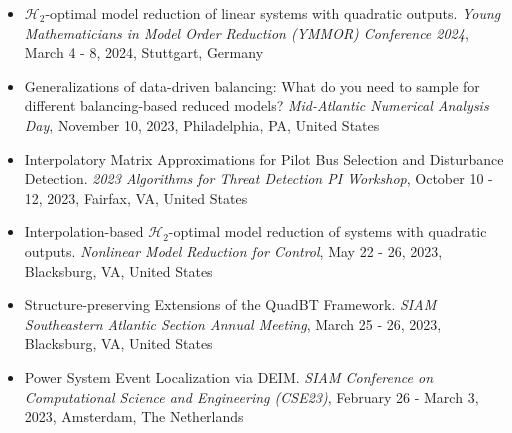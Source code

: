 \documentclass[10pt,a4paper,sans]{moderncv}        %
\begin{document}
\begin{itemize}
    \item $\mathcal{H}_2$-optimal model reduction of linear systems with quadratic outputs. \textit{Young Mathematicians in Model Order Reduction (YMMOR) Conference 2024}, March 4 - 8, 2024, Stuttgart, Germany
    \vspace{2pt}
    \item Generalizations of data-driven balancing: What do you need to sample for different balancing-based reduced models? \textit{Mid-Atlantic Numerical Analysis Day}, November 10, 2023, Philadelphia, PA, United States
    \vspace{2pt}
    \item Interpolatory Matrix Approximations for Pilot Bus Selection and Disturbance Detection. \textit{2023 Algorithms for Threat Detection PI Workshop}, October 10 - 12, 2023, Fairfax, VA, United States
    \vspace{2pt}
    \item Interpolation-based $\mathcal{H}_2$-optimal model reduction of systems with quadratic outputs. \textit{Nonlinear Model Reduction for Control}, May 22 - 26, 2023, Blacksburg, VA, United States
    \vspace{2pt}
    \item Structure-preserving Extensions of the QuadBT Framework. \textit{SIAM Southeastern Atlantic Section Annual Meeting}, March 25 - 26, 2023, Blacksburg, VA, United States
    \vspace{2pt}
    \item Power System Event Localization via DEIM. \textit{SIAM Conference on Computational Science and Engineering (CSE23)}, February 26 - March 3, 2023, Amsterdam, The Netherlands
    \vspace{2pt}
\end{itemize}
\end{document}
